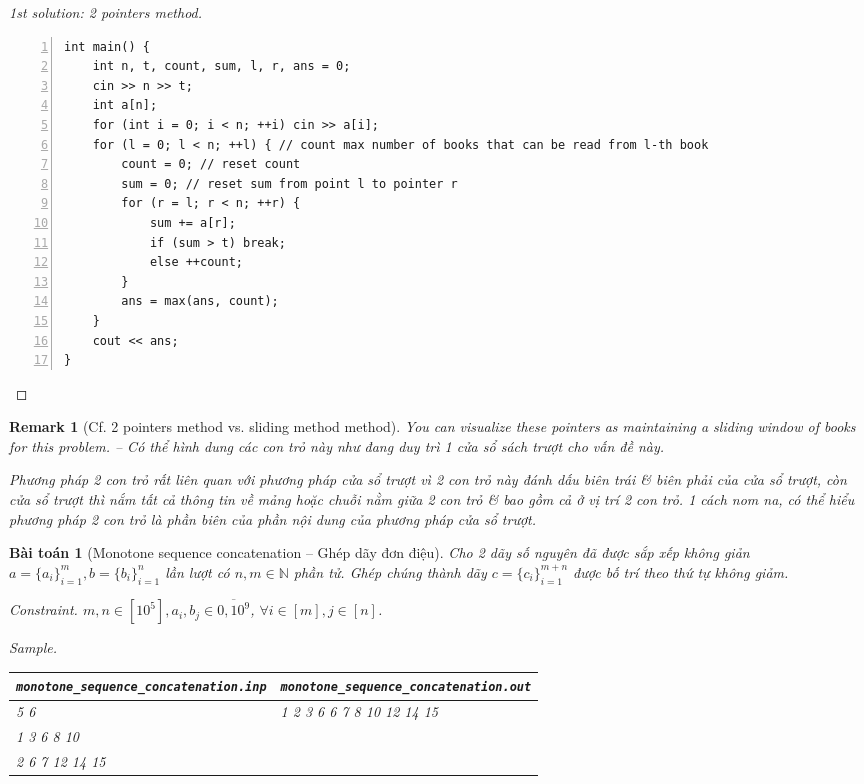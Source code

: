 \documentclass{article}
\newtheorem{baitoan}{Bài toán}
\newtheorem{remark}{Remark}
\begin{document}
\begin{proof}[1st solution: 2 pointers method]
\begin{enumerate}
\begin{Verbatim}[numbers=left,xleftmargin=5mm]
int main() {
    int n, t, count, sum, l, r, ans = 0;
    cin >> n >> t;
    int a[n];
    for (int i = 0; i < n; ++i) cin >> a[i];
    for (l = 0; l < n; ++l) { // count max number of books that can be read from l-th book
        count = 0; // reset count
        sum = 0; // reset sum from point l to pointer r
        for (r = l; r < n; ++r) {
            sum += a[r];
            if (sum > t) break;
            else ++count;
        }
        ans = max(ans, count);
    }
    cout << ans;
}
        \end{Verbatim}
    \end{enumerate}
\end{proof}

\begin{remark}[Cf. 2 pointers method vs. sliding method method]
    You can visualize these pointers as maintaining a sliding window of books for this problem. -- Có thể hình dung các con trỏ này như đang duy trì 1 cửa sổ sách trượt cho vấn đề này.

    Phương pháp 2 con trỏ rất liên quan với phương pháp cửa sổ trượt vì 2 con trỏ này đánh dấu biên trái \& biên phải của cửa sổ trượt, còn cửa sổ trượt thì nắm tất cả thông tin về mảng hoặc chuỗi nằm giữa 2 con trỏ \& bao gồm cả ở vị trí 2 con trỏ. 1 cách nom na, có thể hiểu phương pháp 2 con trỏ là phần biên của phần nội dung của phương pháp cửa sổ trượt.
\end{remark}

\begin{baitoan}[Monotone sequence concatenation -- Ghép dãy đơn điệu]
    Cho 2 dãy số nguyên đã được sắp xếp không giản $a = \{a_i\}_{i=1}^m,b = \{b_i\}_{i=1}^n$ lần lượt có $n,m\in\mathbb{N}$ phần tử. Ghép chúng thành dãy $c = \{c_i\}_{i=1}^{m+n}$ được bố trí theo thứ tự không giảm.
    \item {\sf Constraint.} $m,n\in[10^5],a_i,b_j\in\overline{0,10^9}$, $\forall i\in[m],j\in[n]$.
    \item {\sf Sample.}
    \begin{table}[H]
        \centering
        \begin{tabular}{|l|l|}
            \hline
            \verb|monotone_sequence_concatenation.inp| & \verb|monotone_sequence_concatenation.out| \\
            \hline
            5 6 & 1 2 3 6 6 7 8 10 12 14 15 \\
            1 3 6 8 10 & \\
            2 6 7 12 14 15 & \\
            \hline
        \end{tabular}
    \end{table}
\end{baitoan}
\end{document}
